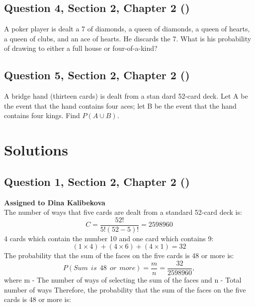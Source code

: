 \documentclass[12pt, a4paper]{article}
\begin{document}
\subsection*{Question 4, Section 2, Chapter 2 (\cite{boyce11th})}



A poker player is dealt a 7 of diamonds, a queen of diamonds, a queen of hearts, a queen of clubs, and an ace of hearts. He discards the 7. What is his probability of drawing to either a full house or four-of-a-kind?


\subsection*{Question 5, Section 2, Chapter 2 (\cite{boyce11th})}



\noindent A bridge hand (thirteen cards) is dealt from a stan dard 52-card deck. Let A be the event that the hand contains four aces; let B be the event that the hand contains four kings. Find
\begin{math}
 P(A \cup B).
 \end{math}\par 

\newpage

\section*{Solutions}

\subsection*{Question 1, Section 2, Chapter 2  (\cite{boyce11th})}

\noindent\textbf{Assigned to Dina Kalibekova}\\

\noindent The number of ways that five cards are dealt from a standard 52-card deck is:
$$
    C=\frac{52!}{5!(52-5)!}= 2598960
$$
4 cards which contain the number 10 and one card which contains 9:
$$
    (1\times4)+(4\times6)+(4\times1)=32
$$
The probability that the sum of the faces on the five cards is 48 or more is:
$$
   P(Sum \ \ is \ \ 48 \ \ or \ \ more) = \frac{m}{n} = \frac{32}{2598960},$$
\newline
where m - The number of ways of selecting the sum of the faces and n - Total number of ways
\newline
Therefore, the probability that the sum of the faces on the five cards is 48 or more is:
\end{document}
